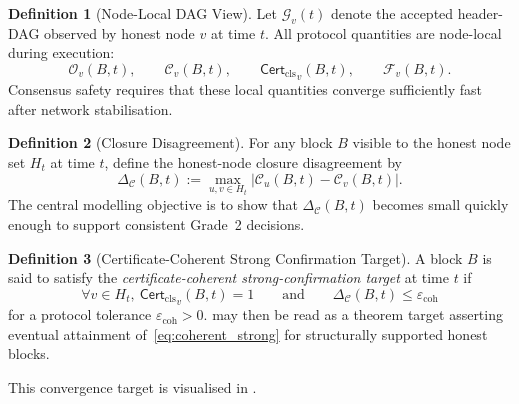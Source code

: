 \documentclass[11pt]{article}
\theoremstyle{definition}
\newtheorem{definition}{Definition}[section]
\theoremstyle{plain}
\theoremstyle{remark}
\newcommand{\Ostr}{\mathcal{O}}          %
\newcommand{\Clvl}{\mathcal{C}}          %
\newcommand{\Ffin}{\mathcal{F}}          %
\newcommand{\Certcls}{\mathsf{Cert}_{\mathrm{cls}}}
\newcommand{\Dag}{\mathcal{G}}          %
\begin{document}
\begin{definition}[Node-Local DAG View]\label{def:local_view}
Let $\Dag_v(t)$ denote the accepted header-DAG observed by honest node $v$ at
time $t$.
All protocol quantities are node-local during execution:
\[
\Ostr_v(B,t), \qquad \Clvl_v(B,t), \qquad {\Certcls}_v(B,t), \qquad \Ffin_v(B,t).
\]
Consensus safety requires that these local quantities converge sufficiently
fast after network stabilisation.
\end{definition}

\begin{definition}[Closure Disagreement]\label{def:closure_gap}
For any block $B$ visible to the honest node set $H_t$ at time $t$, define the
honest-node closure disagreement by
\begin{equation}\label{eq:closure_gap}
\Delta_{\Clvl}(B,t)
:=
\max_{u,v \in H_t}
\left|\Clvl_u(B,t) - \Clvl_v(B,t)\right|.
\end{equation}
The central modelling objective is to show that $\Delta_{\Clvl}(B,t)$ becomes
small quickly enough to support consistent Grade~2 decisions.
\end{definition}

\begin{definition}[Certificate-Coherent Strong Confirmation Target]\label{def:coherent_strong}
A block $B$ is said to satisfy the \emph{certificate-coherent strong-confirmation
target} at time $t$ if
\begin{equation}\label{eq:coherent_strong}
\forall v \in H_t,\ {\Certcls}_v(B,t)=1
\qquad\text{and}\qquad
\Delta_{\Clvl}(B,t) \le \varepsilon_{\mathrm{coh}}
\end{equation}
for a protocol tolerance $\varepsilon_{\mathrm{coh}} > 0$.
 may then be read as a theorem target asserting eventual
attainment of~\eqref{eq:coherent_strong} for structurally supported honest
blocks.
\end{definition}
This convergence target is visualised in .
\end{document}
